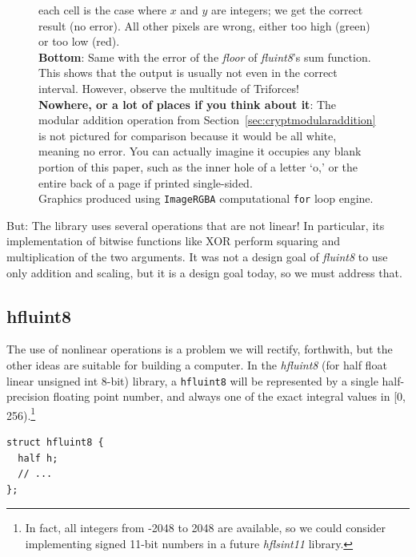 \documentclass[twocolumn]{article}
\begin{document}
\begin{figure}[htp]
{          each cell is the case where $x$ and $y$ are integers; we get
          the correct result (no error). All other pixels are wrong,
          either too high (green) or too low (red).
              \\[1em]
          {\bf Bottom}: Same with the error of the {\em floor} of {\it fluint8}'s
          sum function. This shows that the output is usually not even in the
          correct interval. However, observe the multitude of Triforces!
              \\[1em]
          {\bf Nowhere, or a lot of places if you think about it}: The modular addition
          operation from Section~\ref{sec:cryptmodularaddition} is not
          pictured for comparison because it would be all white, meaning
          no error. You can actually imagine it occupies any blank portion
          of this paper, such as the inner hole of a letter `o,' or the
          entire back of a page if printed single-sided.
              \\[0.25em]
          Graphics produced using {\tt ImageRGBA} computational
          {\tt for} loop engine.
  } \label{fig:adderrordetail}
\end{figure}

But: The library uses several operations that are not linear!
In particular, its implementation of bitwise functions like XOR
perform squaring and multiplication of the two arguments. It
was not a design goal of {\it fluint8} to use only addition and
scaling, but it is a design goal today, so we must address that.

\subsection{hfluint8}

The use of nonlinear operations is a problem we will rectify,
forthwith, but the other ideas are suitable for building a computer.
In the {\it hfluint8} (for half float linear unsigned int 8-bit)
library, a \verb+hfluint8+ will be represented by a single
half-precision floating point number, and always one of the exact
integral values in [0, 256).\footnote{In fact, all integers from -2048
    to 2048 are available, so we could consider implementing signed
    11-bit numbers in a future {\it hflsint11} library.}

\begin{lstlisting}
struct hfluint8 {
  half h;
  // ...
};
\end{lstlisting}
\end{document}
